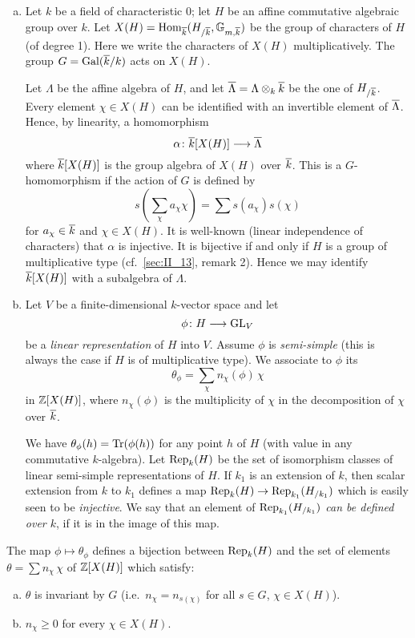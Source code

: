 \begin{enumerate}[a)]
\item Let $k$ be a field of characteristic 0; let $H$ be an affine
	\dpage
	commutative algebraic group over $k$. Let $X(H) = \operatorname{Hom}_{\overline{k}}(H_{/\overline{k}}, \mathbb{G}_{m, \overline{k}})$ be the group of characters of $H$
	(of degree 1). Here we write the characters of $X(H)$ multiplicatively.
	The group $G = \operatorname{Gal}(\overline{k}/k)$ acts on $X(H)$.

	Let $\Lambda$ be the affine algebra of $H$, and let $\overline{\Lambda} =
	\Lambda \otimes_k \overline{k}$ be the one of $H_{/\overline{k}}$. Every
	element $\chi \in X(H)$ can be identified with an invertible element of
	$\overline{\Lambda}$. Hence, by linearity, a homomorphism
	\[
		\alpha \colon \overline{k}[X(H)] \longrightarrow \overline{\Lambda}
	\]
	where $\overline{k}[X(H)]$ is the group algebra of $X(H)$ over $\overline{k}$.
	This is a $G$-homomorphism if the action of $G$ is defined by
	\[
		s\left( \sum_{\chi} a_\chi \chi \right) = \sum s(a_\chi) s(\chi)
	\]
	for $a_\chi \in \overline{k}$ and $\chi \in X(H)$. It is well-known (linear
	independence of characters) that $\alpha$ is injective.  It is
	bijective if and only if $H$ is a group of multiplicative type (cf.\ 
	\ref{sec:II_13}, remark 2). Hence we may identify $\overline{k}[X(H)]$ with
	a subalgebra of $\Lambda$.

\item Let $V$ be a finite-dimensional $k$-vector space and let
	\[
		\phi \colon H \longrightarrow \operatorname{GL}_V
	\]
	be a \emph{linear representation} of $H$ into $V$. Assume $\phi$ is
	\emph{semi-simple} (this is always the case if $H$ is of multiplicative
	type). We associate to $\phi$ its \strong{trace}\index{Trace}
	\[
		\theta_\phi = \sum_{\chi} n_\chi(\phi) \, \chi
	\]
	in $\mathbb{Z}[X(H)]$, where $n_\chi(\phi)$ is the multiplicity of $\chi$ in
	the decomposition of $\chi$ over $\overline{k}$.

	We have $\theta_\phi(h) = \operatorname{Tr}(\phi(h))$ for any point $h$ of $H$
	\dpage
	(with value in any commutative $k$-algebra). Let $\operatorname{Rep}_k(H)$ be the set
	of isomorphism classes of linear semi-simple representations of $H$. If
	$k_1$ is an extension of $k$, then scalar extension from $k$ to $k_1$
	defines a map $\operatorname{Rep}_k(H) \to \operatorname{Rep}_{k_1}(H_{/k_1})$ which is easily seen
	to be \emph{injective}. We say that an element of\break
	\emph{$\operatorname{Rep}_{k_1}(H_{/k_1})$ can be defined over $k$}, if it is in the
	image of this map.
\end{enumerate}
\begin{prop}

The map $\phi \mapsto \theta_\phi$ defines a bijection between
$\operatorname{Rep}_k(H)$ and the set of elements $\theta = \sum n_\chi \, \chi$ of
$\mathbb{Z}[X(H)]$ which satisfy:
\begin{enumerate}[(a)]
	\item $\theta$ is invariant by $G$ (i.e.\ $n_\chi =
		n_{s(\chi)}$ for all $s \in G$, $\chi \in X(H)$).
	\item $n_\chi \ge 0$ for every $\chi \in X(H)$.
\end{enumerate}
\end{prop}
